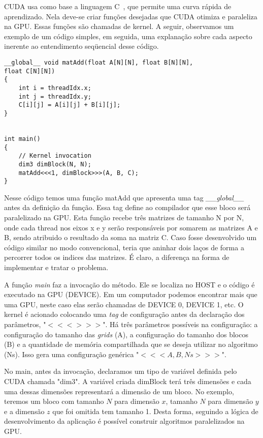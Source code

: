 CUDA usa como base a linguagem C~\cite{cuda}, que permite uma curva rápida de aprendizado. Nela deve-se criar funções desejadas que CUDA otimiza e paraleliza na GPU. Essas funções são chamadas de kernel. A seguir, observamos um exemplo de um código simples, em seguida, uma explanação sobre cada aspecto inerente ao entendimento seqüencial desse código.


\begin{verbatim}
__global__ void matAdd(float A[N][N], float B[N][N],
float C[N][N])
{
    int i = threadIdx.x;
    int j = threadIdx.y;
    C[i][j] = A[i][j] + B[i][j];
}


int main()
{
    // Kernel invocation
    dim3 dimBlock(N, N);
    matAdd<<<1, dimBlock>>>(A, B, C);
}

\end{verbatim}

Nesse código temos uma função matAdd que apresenta uma tag \textit{\_\_global\_\_} antes da definição da função. Essa tag define ao compilador que esse bloco será paralelizado na GPU.  Esta função recebe três matrizes de tamanho N por N, onde cada thread nos eixos x e y serão responsáveis por somarem as matrizes A e B, sendo atribuido o resultado da soma na matriz C.  Caso fosse desenvolvido um código similar no modo convencional, teria que aninhar dois laços de forma a percorrer todos os indices das matrizes. É claro, a diferença na forma de implementar e tratar o problema.

A função \textit{main} faz a invocação do método. Ele se localiza no HOST e o código é executado na GPU (DEVICE). Em um computador podemos encontrar mais que uma GPU, neste caso elas serão chamadas de DEVICE 0, DEVICE 1, etc. O kernel é acionado colocando uma \textit{tag} de configuração antes da declaração dos parâmetros, "$<<< >>>$". Há três parâmetros possíveis na configuração: a configuração do tamanho das \textit{grids} (A), a configuração do tamanho dos blocos (B) e a quantidade de memória compartilhada que se deseja utilizar no algoritmo (Ns). Isso gera uma configuração genérica "$<<<A,B,Ns >>>$".

No main, antes da invocação, declaramos um tipo de variável definida pelo CUDA chamada "dim3". A variável criada dimBlock terá três dimensões e cada uma dessas dimensões representará a dimensão de um bloco. No exemplo, teremos um bloco com tamanho $N$ para dimensão $x$, tamanho $N$ para dimensão $y$ e a dimensão $z$ que foi omitida tem tamanho 1. Desta forma, seguindo a lógica de desenvolvimento da aplicação é possível construir algoritmos paralelizados na GPU.


